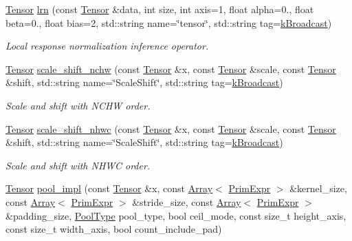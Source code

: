 \begin{DoxyCompactItemize}
\hyperlink{classtvm_1_1te_1_1Tensor}{Tensor} \hyperlink{namespacetopi_1_1nn_a0ded232c2572637db6adc7cf5f0b35b2}{lrn} (const \hyperlink{classtvm_1_1te_1_1Tensor}{Tensor} \&data, int size, int axis=1, float alpha=0., float beta=0., float bias=2, std\+::string name=\char`\"{}tensor\char`\"{}, std\+::string tag=\hyperlink{namespacetopi_a794b9155e9ba9d1c9c42a1cff1fb645f}{k\+Broadcast})
\begin{DoxyCompactList}\small\item\em Local response normalization inference operator. \end{DoxyCompactList}\item 
\hyperlink{classtvm_1_1te_1_1Tensor}{Tensor} \hyperlink{namespacetopi_1_1nn_ae9516b844130a2189ad2989b646ec2b1}{scale\+\_\+shift\+\_\+nchw} (const \hyperlink{classtvm_1_1te_1_1Tensor}{Tensor} \&x, const \hyperlink{classtvm_1_1te_1_1Tensor}{Tensor} \&scale, const \hyperlink{classtvm_1_1te_1_1Tensor}{Tensor} \&shift, std\+::string name=\char`\"{}Scale\+Shift\char`\"{}, std\+::string tag=\hyperlink{namespacetopi_a794b9155e9ba9d1c9c42a1cff1fb645f}{k\+Broadcast})
\begin{DoxyCompactList}\small\item\em Scale and shift with N\+C\+HW order. \end{DoxyCompactList}\item 
\hyperlink{classtvm_1_1te_1_1Tensor}{Tensor} \hyperlink{namespacetopi_1_1nn_ab19179f1b4a73a42b17ddf2f5fea46fc}{scale\+\_\+shift\+\_\+nhwc} (const \hyperlink{classtvm_1_1te_1_1Tensor}{Tensor} \&x, const \hyperlink{classtvm_1_1te_1_1Tensor}{Tensor} \&scale, const \hyperlink{classtvm_1_1te_1_1Tensor}{Tensor} \&shift, std\+::string name=\char`\"{}Scale\+Shift\char`\"{}, std\+::string tag=\hyperlink{namespacetopi_a794b9155e9ba9d1c9c42a1cff1fb645f}{k\+Broadcast})
\begin{DoxyCompactList}\small\item\em Scale and shift with N\+H\+WC order. \end{DoxyCompactList}\item 
\hyperlink{classtvm_1_1te_1_1Tensor}{Tensor} \hyperlink{namespacetopi_1_1nn_ad51533b09956d7bc8de2537adf3b6b77}{pool\+\_\+impl} (const \hyperlink{classtvm_1_1te_1_1Tensor}{Tensor} \&x, const \hyperlink{classtvm_1_1Array}{Array}$<$ \hyperlink{classtvm_1_1PrimExpr}{Prim\+Expr} $>$ \&kernel\+\_\+size, const \hyperlink{classtvm_1_1Array}{Array}$<$ \hyperlink{classtvm_1_1PrimExpr}{Prim\+Expr} $>$ \&stride\+\_\+size, const \hyperlink{classtvm_1_1Array}{Array}$<$ \hyperlink{classtvm_1_1PrimExpr}{Prim\+Expr} $>$ \&padding\+\_\+size, \hyperlink{namespacetopi_1_1nn_ac531cfce9c3a031fa25cfb6ed1f9b95b}{Pool\+Type} pool\+\_\+type, bool ceil\+\_\+mode, const size\+\_\+t height\+\_\+axis, const size\+\_\+t width\+\_\+axis, bool count\+\_\+include\+\_\+pad)

\end{DoxyCompactItemize}
